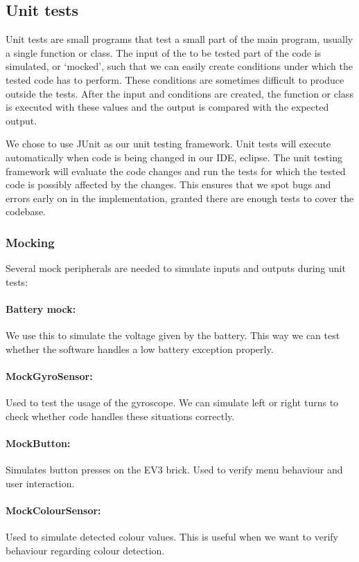 \documentclass[a4paper,oneside,11pt]{article}
\begin{document}
\subsection{Unit tests}
Unit tests are small programs that test a small part of the main program, usually a single function or class. The input of the to be tested part of the code is simulated, or ‘mocked’, such that we can easily create conditions under which the tested code has to perform. These conditions are sometimes difficult to produce outside the tests. After the input and conditions are created, the function or class is executed with these values and the output is compared with the expected output.

We chose to use JUnit as our unit testing framework. Unit tests will execute automatically when code is being changed in our IDE, eclipse. The unit testing framework will evaluate the code changes and run the tests for which the tested code is possibly affected by the changes. This ensures that we spot bugs and errors early on in the implementation, granted there are enough tests to cover the codebase.

\subsubsection{Mocking}
Several mock peripherals are needed to simulate inputs and outputs during unit tests:

\paragraph{Battery mock:} We use this to simulate the voltage given by the battery. This way we can test whether the software handles a low battery exception properly.

\paragraph{MockGyroSensor:} Used to test the usage of the gyroscope. We can simulate left or right turns to check whether code handles these situations correctly.

\paragraph{MockButton:} Simulates button presses on the EV3 brick. Used to verify menu behaviour and user interaction.

\paragraph{MockColourSensor:} Used to simulate detected colour values. This is useful when we want to verify behaviour regarding colour detection. 
\end{document}
